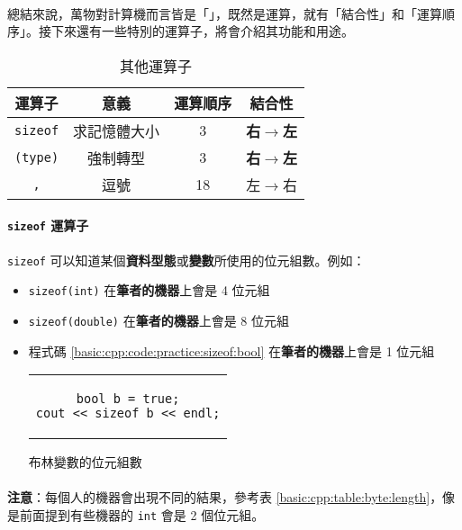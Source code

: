 \documentclass[12pt,a4paper,oneside]{article}
\begin{document}
\begin{CJK}{UTF8}{bkai}
\paragraph{}總結來說，萬物對計算機而言皆是「」，既然是運算，就有「結合性」和「運算順序」。接下來還有一些特別的運算子，將會介紹其功能和用途。

\begin{table}[h!]
\centering
\begin{tabular}{|c|c|c|c|}
\hline
運算子 & 意義 & 運算順序 & 結合性\\
\hline
\hline
\lstinline!sizeof! & 求記憶體大小 & 3 & \textbf{右$\rightarrow$左}\\
\hline
\lstinline!(type)! & 強制轉型    & 3 & \textbf{右$\rightarrow$左}\\
\hline
\lstinline!,!      & 逗號       & 18 & 左$\rightarrow$右\\
\hline
\end{tabular}
\caption{其他運算子}
\label{basic:cpp:table:operator:others}
\end{table}


\paragraph{\lstinline!sizeof! 運算子}\lstinline!sizeof! 可以知道某個\textbf{資料型態}或\textbf{變數}所使用的位元組數。例如：

\begin{itemize}
\item \lstinline!sizeof(int)! 在\textbf{筆者的機器}上會是 4 位元組
\item \lstinline!sizeof(double)! 在\textbf{筆者的機器}上會是 8 位元組
\item 程式碼 \ref{basic:cpp:code:practice:sizeof:bool} 在\textbf{筆者的機器}上會是 1 位元組

\begin{code}[h!]
\centering
\begin{tabular}{c}
\begin{lstlisting}
bool b = true;
cout << sizeof b << endl;
\end{lstlisting}
\end{tabular}
\caption{布林變數的位元組數}
\label{basic:cpp:code:practice:sizeof:bool}
\end{code}
\end{itemize}

\paragraph{}\textbf{注意}：每個人的機器會出現不同的結果，參考表 \ref{basic:cpp:table:byte:length}，像是前面提到有些機器的 \lstinline!int! 會是 2 個位元組。


\end{CJK}
\end{document}
